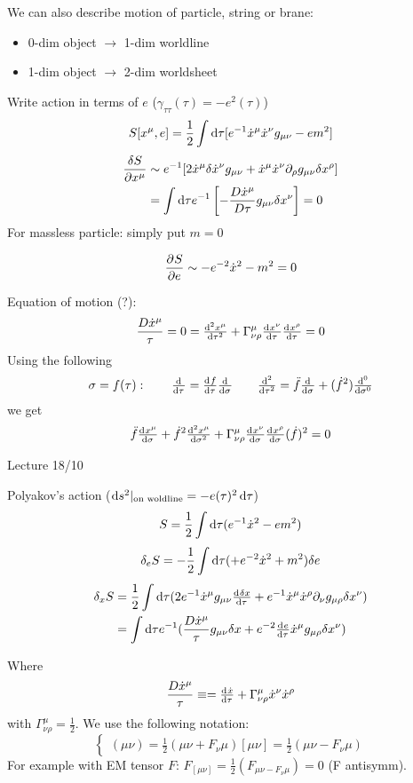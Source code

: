 We can also describe motion of particle, string or brane:
\begin{itemize}
\item 0-dim object $\to$ 1-dim worldline
\item 1-dim object $\to$ 2-dim worldsheet
\end{itemize}

Write action in terms of $e$ ($\gamma_{\tau\tau}(\tau) = -e^2(\tau)$)
\[ S[x^\mu,e] = \frac{1}{2} \int \operatorname{d \!}{\tau} [e^{-1}\dot{x}^\mu\dot{x}^\nu g_{\mu\nu} - em^2] \]
\begin{align*} \frac{\delta S}{\partial x^\mu} &\sim e^{-1}[2\dot{x}^\mu \delta \dot{x}^\nu g_{\mu\nu} + \dot{x}^\mu\dot{x}^\nu \partial_\rho g_{\mu\nu} \delta x^\rho] \\ &= \int \operatorname{d \!}{\tau}e^{-1} \left[ - \frac{D\dot{x}^\mu}{D\tau} g_{\mu\nu} \delta x^\nu \right] = 0 \end{align*}
For massless particle: simply put $m=0$

\[  \frac{\partial{^{}}S}{\partial{{e}^{}}}  \sim -e^{-2}\dot{x}^2 - m^2 = 0 \]

Equation of motion (?):
\[ \frac{D\dot{x}^\mu}{\tau} = 0 =	\od[2]{x^\mu}{\tau} + \Gamma^\mu_{\nu\rho}\od{x^\nu}{\tau}\od{x^\rho}{\tau} = 0 \]
Using the following
\[\sigma = f(\tau): \qquad \od{}{\tau} = \od{f}{\tau}\od{}{\sigma} \qquad \od[2]{}{\tau} = \ddot{f}\od{}{\sigma} + (\dot{f}^2)\od[0]{}{\sigma}\]
we get
\[ \ddot{f}\od{x^\mu}{\sigma} + \dot{f}^2 \od[2]{x^\mu}{\sigma} + \Gamma^\mu_{\nu\rho}\od{x^\nu}{\sigma} \od{x^\rho}{\sigma}(\dot{f})^2 = 0  \]

Lecture 18/10

Polyakov's action ($\operatorname{d \!}{s}^2|_{\text{on woldline}} = - e(\tau)^2 \operatorname{d \!}{\tau}$)
\[ S= \frac{1}{2} \int \operatorname{d \!}{\tau}(e^{-1}\dot{x}^2 - em^2) \]
\[ \delta_e S = - \frac{1}{2}\int \operatorname{d \!}{\tau}(+e^{-2}\dot{x}^2 + m^2)\delta e \]
\begin{align*} \delta_x S &= \frac{1}{2}\int \diff{\tau}(2e^{-1}\dot{x}^\mu g_{\mu\nu} \od{\delta x}{\tau} + e^{-1}\dot{x}^\mu \dot{x}^\rho \partial_\nu g_{\mu\rho}\delta x^\nu) \\
&= \int \diff{\tau}e^{-1}(\frac{D \dot{x}^\mu}{\tau}g_{\mu\nu}\delta x + e^{-2} \od{e}{\tau} \dot{x}^\mu g_{\mu\rho}\delta x^\nu)
\end{align*}

Where
\[ \frac{D \dot{x}^\mu}{\tau} \equiv = \od{\dot{x}}{\tau} + \Gamma^\mu_{\nu\rho}\dot{x}^\nu\dot{x}^\rho \]
with $\Gamma^\mu_{\nu\rho} = \frac{1}{2}$. We use the following notation:
\[ \begin{cases}
(\mu\nu) = \frac{1}{2} (\mu\nu + F_\nu\mu)
[\mu\nu] = \frac{1}{2} (\mu\nu - F_\nu\mu)
\end{cases} \]
For example with EM tensor $F$: $F_{[\mu\nu]} = \frac{1}{2}(F_{\mu\nu - F_\nu\mu}) = 0$ (F antisymm).

